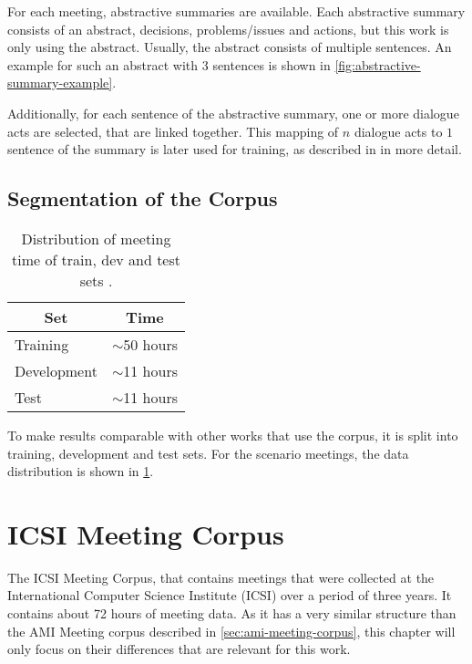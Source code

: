 For each meeting, abstractive summaries are available.
Each abstractive summary consists of an abstract, decisions, problems/issues and actions, but this work is only using the abstract.
Usually, the abstract consists of multiple sentences.
An example for such an abstract with 3 sentences is shown in \cref{fig:abstractive-summary-example}.

Additionally, for each sentence of the abstractive summary, one or more dialogue acts are selected, that are linked together.
This mapping of $n$ dialogue acts to $1$ sentence of the summary is later used for training, as described in \label{sec:concept-training} in more detail. \cite{amiWebsite}

\subsection{Segmentation of the Corpus}\label{ssec:ami-segmentation-of-the-corpus}

\begin{table}[h]
\centering
\begin{tabular}{@{}ll@{}}
\toprule
\multicolumn{1}{c}{Set} & \multicolumn{1}{c}{Time} \\ \midrule
Training & $\sim$50 hours \\
Development & $\sim$11 hours \\
Test & $\sim$11 hours \\ \bottomrule
\end{tabular}
\caption[Distribution of meeting time of train, dev and test sets]{Distribution of meeting time of train, dev and test sets \cite{amiWebsite}.}
\label{tab:meeting-time-distribution}
\end{table}

To make results comparable with other works that use the corpus, it is split into training, development and test sets.
For the scenario meetings, the data distribution is shown in \cref{tab:meeting-time-distribution}. \cite{amiWebsite}


\section{ICSI Meeting Corpus}

The ICSI Meeting Corpus, that contains meetings that were collected at the International Computer Science Institute (ICSI) over a period of three years.
It contains about 72 hours of meeting data. \cite{Janin}
As it has a very similar structure than the AMI Meeting corpus described in \cref{sec:ami-meeting-corpus}, this chapter will only focus on their differences that are relevant for this work.

